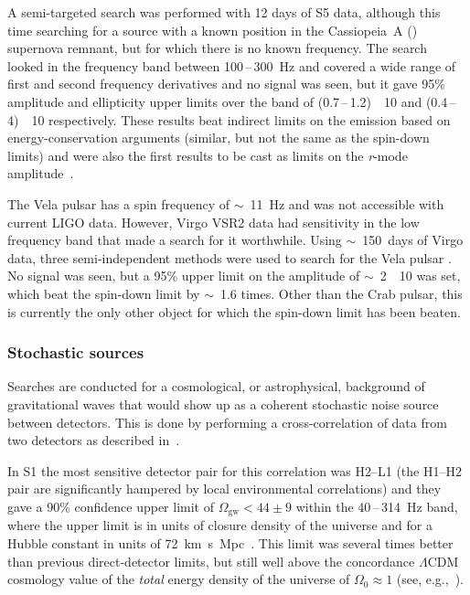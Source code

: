 A semi-targeted search was performed with 12 days of S5 data, although this time
searching for a source with a known position in the Cassiopeia~A ()
supernova remnant, but for which there is no known frequency. The
search~\cite{Abadie:2010g} looked in the frequency band between
100\,--\,300~Hz and covered a wide range of first and second frequency
derivatives and no signal was seen, but it gave 95\% amplitude and
ellipticity upper limits over the band of
(0.7\,--\,1.2)~\texttimes~10 and
(0.4\,--\,4)~\texttimes~10 respectively. These results beat
indirect limits on the emission based on energy-conservation arguments
(similar, but not the same as the spin-down limits) and were also the
first results to be cast as limits on the \textit{r}-mode amplitude~\cite{Owen:2010}.


The Vela pulsar has a spin frequency of $\sim$~11~Hz and was not accessible with
current LIGO data.  However, Virgo VSR2 data had sensitivity in the low
frequency band that made a search for it worthwhile. Using $\sim$~150~days of
Virgo data, three semi-independent methods were used to search for the
Vela pulsar \cite{Abadie:2011b}. No signal was seen, but a 95\% upper limit on
the amplitude of $\sim$~2~\texttimes~10 was set, which beat the spin-down limit
by $\sim$~1.6 times. Other than the Crab pulsar, this is currently the only other
object for which the spin-down limit has been beaten.


\subsubsection{Stochastic sources}


Searches are conducted for a cosmological, or astrophysical, background of
gravitational waves that would show up as a coherent stochastic noise source
between detectors. This is done by performing a cross-correlation of data from
two detectors as described in~\cite{Allen:1999b}.


In S1 the most sensitive detector pair for this correlation was H2--L1 (the H1--H2
pair are significantly hampered by local environmental correlations) and they
gave a 90\% confidence upper limit of $\Omega_{\mathrm{gw}} < 44\pm9$ within the 40\,--\,314~Hz band, where the upper limit is in
units of closure density of the universe and for a Hubble constant in units of
72~km~s~Mpc~\cite{Abbott:2004e}. This limit was several times
better than previous direct-detector limits, but still well above the
concordance $\Lambda$CDM cosmology value of the \textit{total} energy density of
the universe of $\Omega_0\approx1$ (see, e.g.,~\cite{Jarosik:2010}).


